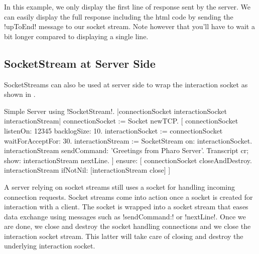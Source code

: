 \documentclass[a4paper,10pt,twoside]{book}
\begin{document}
In this example, we only display the first line of response sent by the server.
We can easily display the full response including the html code by sending the \ct!upToEnd! message to our socket stream.
Note however that you'll have to wait a bit longer compared to displaying a single line.

\subsection{SocketStream at Server Side}
SocketStreams can also be used at server side to wrap the interaction socket as shown in .

\begin{script}{Simple Server using \ct!SocketStream!.}
|connectionSocket interactionSocket interactionStream|
connectionSocket := Socket newTCP. 
[
	connectionSocket listenOn: 12345 backlogSize: 10. 
	interactionSocket := connectionSocket waitForAcceptFor: 30. 
	interactionStream := SocketStream on: interactionSocket.
	interactionStream sendCommand: 'Greetings from Pharo Server'.
	Transcript cr; show: interactionStream nextLine.
] ensure: [
	connectionSocket closeAndDestroy.
	interactionStream ifNotNil: [interactionStream close]
]
\end{script}

A server relying on socket streams still uses a socket for handling incoming connection requests.
Socket streams come into action once a socket is created for interaction with a client.
The socket is wrapped into a socket stream that eases data exchange using messages such as \ct!sendCommand:! or \ct!nextLine!.
Once we are done, we close and destroy the socket handling connections and we close the interaction socket stream.
This latter will take care of closing and destroy the underlying interaction socket.

\end{document}
